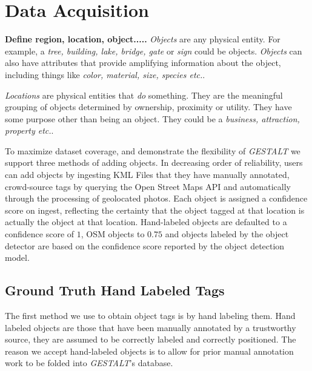 \section{Data Acquisition}
\label{section:data}



\textbf{Define region, location, object.....}
\emph{Objects} are any physical entity. For example, a \textit{tree, building, lake, bridge, gate} or \textit{sign} could be objects. \textit{Objects} can also have attributes that provide amplifying information about the object, including things like \textit{color, material, size, species etc.}. 

\emph{Locations} are physical entities that \textit{do} something. They are the meaningful grouping of objects determined by ownership, proximity or utility. They have some purpose other than being an object. They could be a \textit{business, attraction, property etc.}. 



To maximize dataset coverage, and demonstrate the flexibility of \emph{GESTALT} we support three methods of adding objects. 
In decreasing order of reliability, users can add objects by ingesting KML Files that they have manually annotated, crowd-source tags by querying the Open Street Maps API and automatically through the processing of geolocated photos. 
Each object is assigned a confidence score on ingest, reflecting the certainty that the object tagged at that location is actually the object at that location. 
Hand-labeled objects are defaulted to a confidence score of $1$, OSM objects to $0.75$ and objects labeled by the object detector are based on the confidence score reported by the object detection model. 

\subsection{Ground Truth Hand Labeled Tags}
The first method we use to obtain object tags is by hand labeling them. 
Hand labeled objects are those that have been manually annotated by a trustworthy source, they are assumed to be correctly labeled and correctly positioned. 
The reason we accept hand-labeled objects is to allow for prior manual annotation work to be folded into \emph{GESTALT}'s database. 

